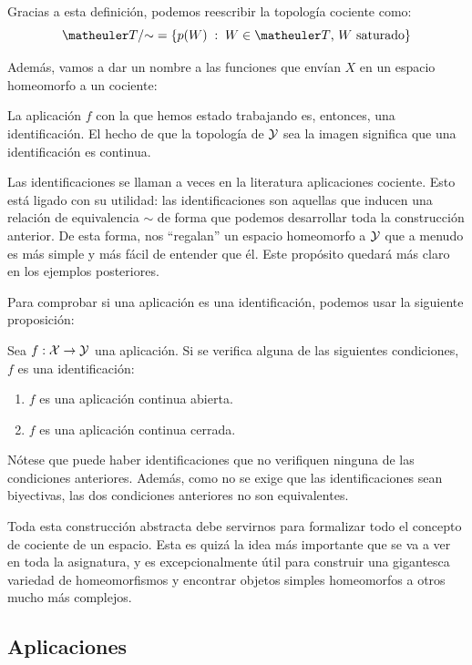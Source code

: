 Gracias a esta definición, podemos reescribir la topología cociente como:
\[\T/\mathord{\sim} = \{p(W)\midc W\in\T\text{, } W\text{ saturado}\}\]

Además, vamos a dar un nombre a las funciones que envían $X$ en un espacio homeomorfo a un cociente:

La aplicación $f$ con la que hemos estado trabajando es, entonces, una identificación. El hecho de que la topología de $\mathcal{Y}$ sea la imagen significa que una identificación es continua.

Las identificaciones se llaman a veces en la literatura aplicaciones cociente. Esto está ligado con su utilidad: las identificaciones son aquellas que inducen una relación de equivalencia $\sim$ de forma que podemos desarrollar toda la construcción anterior. De esta forma, nos ``regalan'' un espacio homeomorfo a $\mathcal{Y}$ que a menudo es más simple y más fácil de entender que él. Este propósito quedará más claro en los ejemplos posteriores.

Para comprobar si una aplicación es una identificación, podemos usar la siguiente proposición:

\begin{prop}
	Sea $f:\mathcal{X}\to\mathcal{Y}$ una aplicación. Si se verifica alguna de las siguientes condiciones, $f$ es una identificación:
	\begin{enumerate}
		\item $f$ es una aplicación continua abierta.
		\item $f$ es una aplicación continua cerrada.
	\end{enumerate}
\end{prop}

Nótese que puede haber identificaciones que no verifiquen ninguna de las condiciones anteriores. Además, como no se exige que las identificaciones sean biyectivas, las dos condiciones anteriores no son equivalentes.

Toda esta construcción abstracta debe servirnos para formalizar todo el concepto de cociente de un espacio. Esta es quizá la idea más importante que se va a ver en toda la asignatura, y es excepcionalmente útil para construir una gigantesca variedad de homeomorfismos y encontrar objetos simples homeomorfos a otros mucho más complejos.
\subsection{Aplicaciones}

